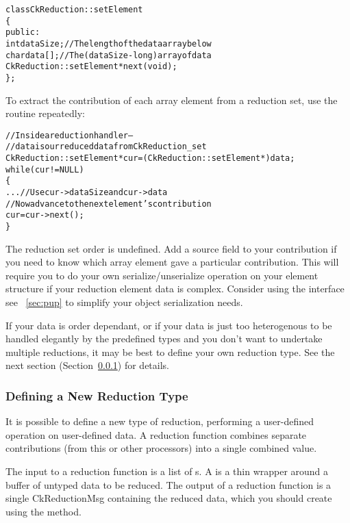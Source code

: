 \begin{alltt}
class CkReduction::setElement 
\{
public:
  int dataSize;//The length of the data array below
  char data[];//The (dataSize-long) array of data
  CkReduction::setElement *next(void);
\};
\end{alltt}

To extract the contribution of each array element from a reduction set, use the
 routine repeatedly:

\begin{alltt}
  //Inside a reduction handler-- 
  //  data is our reduced data from CkReduction_set
  CkReduction::setElement *cur=(CkReduction::setElement *)data;
  while (cur!=NULL)
  \{
    ... //Use cur->dataSize and cur->data
    //Now advance to the next element's contribution
    cur=cur->next();
  \}
\end{alltt}

The reduction set order is undefined.  Add a source field to your
contribution if you need to know which array element gave a particular
contribution.  This will require you to do your own
serialize/unserialize operation on your element structure if your
reduction element data is complex.  Consider using the 
interface see ~\ref{sec:pup} to simplify your object serialization
needs.

If your data is order dependant, or if your data is just too
heterogenous to be handled elegantly by the predefined types and you
don't want to undertake multiple reductions, it may be best to define
your own reduction type.  See the next section
(Section~\ref{new_type_reduction}) for details.


\subsubsection{Defining a New Reduction Type}
\label{new_type_reduction}

It is possible to define a new type of reduction, performing a 
user-defined operation on user-defined data.  A reduction function
combines separate contributions (from this or other processors)
into a single combined value.

The input to a reduction function is a list of s.
A  is a thin wrapper around a buffer of untyped data
to be reduced.  
The output of a reduction function is a single CkReductionMsg
containing the reduced data, which you should create using the
 method.  

